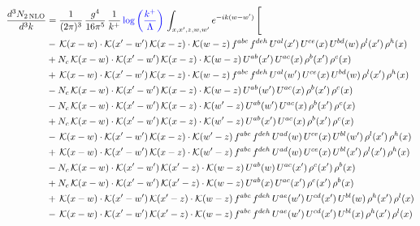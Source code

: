 \documentclass[9pt]{article}
\numberwithin{equation}{section}
\begin{document}
\begin{align}
\frac{d^{3}N_{2\,\mathrm{NLO}}}{d^{3}k} & = \frac{1}{(2\pi)^{3}}\,\frac{g^{4}}{16\pi^{5}}\,\frac{1}{k^{+}}\,{\color{blue}\log{\left(\frac{k^{+}}{\Lambda}\right)}}\,\int_{x,x',z,w,w'}e^{-ik(w-w')}\,\Bigg[\notag\\ & -\,\mathcal{K}(x-w)\cdot\mathcal{K}(x'-w')\,\mathcal{K}(x-z)\cdot\mathcal{K}(w-z)\,f^{abc}\,f^{deh}\,U^{al}(x')\,U^{ce}(x)\,U^{bd}(w)\,\rho^{l}(x')\,\rho^{h}(x)\notag\\
& +N_{c}\,\mathcal{K}(x-w)\cdot\mathcal{K}(x'-w')\,\mathcal{K}(x-z)\cdot\mathcal{K}(w-z)\,U^{ab}(x')\,U^{ac}(x)\,\rho^{b}(x')\,\rho^{c}(x)\notag\\
& +\,\mathcal{K}(x-w)\cdot\mathcal{K}(x'-w')\,\mathcal{K}(x-z)\cdot\mathcal{K}(w-z)\,f^{abc}\,f^{deh}\,U^{al}(w')\,U^{ce}(x)\,U^{bd}(w)\,\rho^{l}(x')\,\rho^{h}(x)\notag\\
& -N_{c}\,\mathcal{K}(x-w)\cdot\mathcal{K}(x'-w')\,\mathcal{K}(x-z)\cdot\mathcal{K}(w-z)\,U^{ab}(w')\,U^{ac}(x)\,\rho^{b}(x')\,\rho^{c}(x)\notag\\
& -N_{c}\,\mathcal{K}(x-w)\cdot\mathcal{K}(x'-w')\,\mathcal{K}(x-z)\cdot\mathcal{K}(w'-z)\,U^{ab}(w')\,U^{ac}(x)\,\rho^{b}(x')\,\rho^{c}(x)\notag\\
& +N_{c}\,\mathcal{K}(x-w)\cdot\mathcal{K}(x'-w')\,\mathcal{K}(x-z)\cdot\mathcal{K}(w'-z)\,U^{ab}(x')\,U^{ac}(x)\,\rho^{b}(x')\,\rho^{c}(x)\notag\\
& -\,\mathcal{K}(x-w)\cdot\mathcal{K}(x'-w')\,\mathcal{K}(x-z)\cdot\mathcal{K}(w'-z)\,f^{abc}\,f^{deh}\,U^{ad}(w)\,U^{ce}(x)\,U^{bl}(w')\,\rho^{l}(x')\,\rho^{h}(x)\notag\\
& +\,\mathcal{K}(x-w)\cdot\mathcal{K}(x'-w')\,\mathcal{K}(x-z)\cdot\mathcal{K}(w'-z)\,f^{abc}\,f^{deh}\,U^{ad}(w)\,U^{ce}(x)\,U^{bl}(x')\,\rho^{l}(x')\,\rho^{h}(x)\notag\\
& -N_{c}\,\mathcal{K}(x-w)\cdot\mathcal{K}(x'-w')\,\mathcal{K}(x'-z)\cdot\mathcal{K}(w-z)\,U^{ab}(w)\,U^{ac}(x')\,\rho^{c}(x')\,\rho^{b}(x)\notag\\
& +N_{c}\,\mathcal{K}(x-w)\cdot\mathcal{K}(x'-w')\,\mathcal{K}(x'-z)\cdot\mathcal{K}(w-z)\,U^{ab}(x)\,U^{ac}(x')\,\rho^{c}(x')\,\rho^{b}(x)\notag\\
& +\,\mathcal{K}(x-w)\cdot\mathcal{K}(x'-w')\,\mathcal{K}(x'-z)\cdot\mathcal{K}(w-z)\,f^{abc}\,f^{deh}\,U^{ae}(w')\,U^{cd}(x')\,U^{bl}(w)\,\rho^{h}(x')\,\rho^{l}(x)\notag\\
& -\,\mathcal{K}(x-w)\cdot\mathcal{K}(x'-w')\,\mathcal{K}(x'-z)\cdot\mathcal{K}(w-z)\,f^{abc}\,f^{deh}\,U^{ae}(w')\,U^{cd}(x')\,U^{bl}(x)\,\rho^{h}(x')\,\rho^{l}(x)\notag\\

\end{align}
\end{document}
